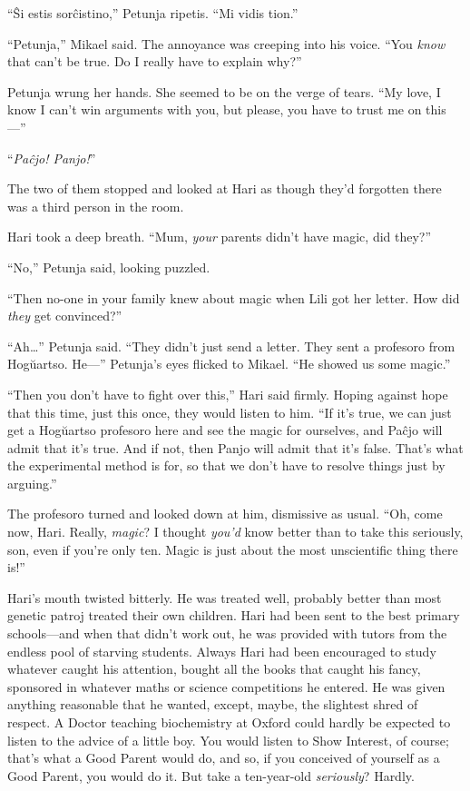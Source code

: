 “Ŝi estis sorĉistino,” Petunja ripetis. “Mi vidis tion.”

“Petunja,” Mikael said. The annoyance was creeping into his voice. “You \emph{know} that can’t be true. Do I really have to explain why?”

Petunja wrung her hands. She seemed to be on the verge of tears. “My love, I know I can’t win arguments with you, but please, you have to trust me on this—”

“\emph{Paĉjo! Panjo!}”

The two of them stopped and looked at Hari as though they’d forgotten there was a third person in the room.

Hari took a deep breath. “Mum, \emph{your} parents didn’t have magic, did they?”

“No,” Petunja said, looking puzzled.

“Then no-one in your family knew about magic when Lili got her letter. How did \emph{they} get convinced?”

“Ah…” Petunja said. “They didn’t just send a letter. They sent a profesoro from Hogŭartso. He—” Petunja’s eyes flicked to Mikael. “He showed us some magic.”

“Then you don’t have to fight over this,” Hari said firmly. Hoping against hope that this time, just this once, they would listen to him. “If it’s true, we can just get a Hogŭartso profesoro here and see the magic for ourselves, and Paĉjo will admit that it’s true. And if not, then Panjo will admit that it’s false. That’s what the experimental method is for, so that we don’t have to resolve things just by arguing.”

The profesoro turned and looked down at him, dismissive as usual. “Oh, come now, Hari. Really, \emph{magic}? I thought \emph{you’d} know better than to take this seriously, son, even if you’re only ten. Magic is just about the most unscientific thing there is!”

Hari’s mouth twisted bitterly. He was treated well, probably better than most genetic patroj treated their own children. Hari had been sent to the best primary schools—and when that didn’t work out, he was provided with tutors from the endless pool of starving students. Always Hari had been encouraged to study whatever caught his attention, bought all the books that caught his fancy, sponsored in whatever maths or science competitions he entered. He was given anything reasonable that he wanted, except, maybe, the slightest shred of respect. A Doctor teaching biochemistry at Oxford could hardly be expected to listen to the advice of a little boy. You would listen to Show Interest, of course; that’s what a Good Parent would do, and so, if you conceived of yourself as a Good Parent, you would do it. But take a ten-year-old \emph{seriously}? Hardly.

